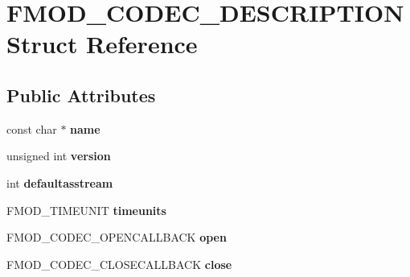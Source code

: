 \hypertarget{struct_f_m_o_d___c_o_d_e_c___d_e_s_c_r_i_p_t_i_o_n}{\section{F\-M\-O\-D\-\_\-\-C\-O\-D\-E\-C\-\_\-\-D\-E\-S\-C\-R\-I\-P\-T\-I\-O\-N Struct Reference}
\label{struct_f_m_o_d___c_o_d_e_c___d_e_s_c_r_i_p_t_i_o_n}
}
\subsection*{Public Attributes}
\begin{DoxyCompactItemize}
\item 
\hypertarget{struct_f_m_o_d___c_o_d_e_c___d_e_s_c_r_i_p_t_i_o_n_a3d2d1cb50c8d3fcee03e465753a9adb0}{const char $\ast$ {\bfseries name}}\label{struct_f_m_o_d___c_o_d_e_c___d_e_s_c_r_i_p_t_i_o_n_a3d2d1cb50c8d3fcee03e465753a9adb0}

\item 
\hypertarget{struct_f_m_o_d___c_o_d_e_c___d_e_s_c_r_i_p_t_i_o_n_a8dfb836ca79931ee6ca39c12bd8aad3f}{unsigned int {\bfseries version}}\label{struct_f_m_o_d___c_o_d_e_c___d_e_s_c_r_i_p_t_i_o_n_a8dfb836ca79931ee6ca39c12bd8aad3f}

\item 
\hypertarget{struct_f_m_o_d___c_o_d_e_c___d_e_s_c_r_i_p_t_i_o_n_ac79461b38a89c34d2ec2e609736df941}{int {\bfseries defaultasstream}}\label{struct_f_m_o_d___c_o_d_e_c___d_e_s_c_r_i_p_t_i_o_n_ac79461b38a89c34d2ec2e609736df941}

\item 
\hypertarget{struct_f_m_o_d___c_o_d_e_c___d_e_s_c_r_i_p_t_i_o_n_a17d05f38ea3ea759d20d463aa8a8ca9f}{F\-M\-O\-D\-\_\-\-T\-I\-M\-E\-U\-N\-I\-T {\bfseries timeunits}}\label{struct_f_m_o_d___c_o_d_e_c___d_e_s_c_r_i_p_t_i_o_n_a17d05f38ea3ea759d20d463aa8a8ca9f}

\item 
\hypertarget{struct_f_m_o_d___c_o_d_e_c___d_e_s_c_r_i_p_t_i_o_n_a6cd1d60659e4c2f1013f3b98924d51a7}{F\-M\-O\-D\-\_\-\-C\-O\-D\-E\-C\-\_\-\-O\-P\-E\-N\-C\-A\-L\-L\-B\-A\-C\-K {\bfseries open}}\label{struct_f_m_o_d___c_o_d_e_c___d_e_s_c_r_i_p_t_i_o_n_a6cd1d60659e4c2f1013f3b98924d51a7}

\item 
\hypertarget{struct_f_m_o_d___c_o_d_e_c___d_e_s_c_r_i_p_t_i_o_n_aa628c3f28fd817bd36876fd845fd1df6}{F\-M\-O\-D\-\_\-\-C\-O\-D\-E\-C\-\_\-\-C\-L\-O\-S\-E\-C\-A\-L\-L\-B\-A\-C\-K {\bfseries close}}\label{struct_f_m_o_d___c_o_d_e_c___d_e_s_c_r_i_p_t_i_o_n_aa628c3f28fd817bd36876fd845fd1df6}


\end{DoxyCompactItemize}
